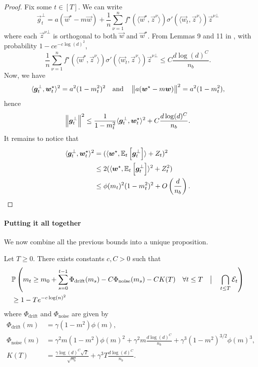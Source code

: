 \begin{proof}
    Fix some $t \in [T]$. We can write
    \[ \vec{g}_t^\bot = a(\vec{w}^\star - m\vec{w}) + \frac1n \sum_{\nu=1}^n f^\star(\langle \vec{w}^\star, \vec{z}^\nu \rangle) \sigma'(\langle \vec{w}_t, \vec{z}^\nu \rangle) \vec{z}^{\nu\bot}\]
    where each $\vec{z}^{\nu\bot}$ is orthogonal to both $\vec{w}$ and $\vec{w}^\star$. From Lemmas 9 and 11 in \cite{dandi2023how}, with probability $1 - ce^{-c\log(d)^2}$,
    \[ \frac1n \sum_{\nu=1}^n f^\star(\langle \vec{w}^\star, \vec{z}^\nu \rangle) \sigma'(\langle \vec{w}_t, \vec{z}^\nu \rangle) \vec{z}^{\nu\bot} \leq C \frac{d\log(d)^C}{n_b}. \]
    Now, we have
    \[ \langle {\boldsymbol{g}}_t^\bot, {\boldsymbol{w}}_t^\star \rangle^2 = a^2(1 - m_t^2)^2 \quad \text{and} \quad \left\lVert a({\boldsymbol{w}}^\star - m{\boldsymbol{w}})\right\rVert^2 = a^2 (1-m_t^2), \]
    hence
    \[ \left\lVert  {\boldsymbol{g}}_t^\bot\right\rVert^2 \leq \frac1{1 - m_t^2} \langle {\boldsymbol{g}}_t^\bot, {\boldsymbol{w}}_t^\star \rangle^2 + C \frac{d\log(d)^C}{n_b}.  \]
    It remains to notice that
    \begin{align*}
        \langle {\boldsymbol{g}}_t^\bot, {\boldsymbol{w}}_t^\star \rangle^2 &= (\langle {\boldsymbol{w}}^\star, \mathbb{E}_t\left[{\boldsymbol{g}}_t^\bot\right] \rangle + Z_t)^2 \\
        &\leq 2(\langle {\boldsymbol{w}}^\star, \mathbb{E}_t\left[{\boldsymbol{g}}_t^\bot\right] \rangle^2 + Z_t^2) \\
        &\leq \phi(m_t)^2(1 - m_t^2)^2 + O\left(\frac{d}{n_b}\right).
    \end{align*}
\end{proof}


\paragraph{Putting it all together} We now combine all the previous bounds into a unique proposition.
\begin{proposition}\label{2406:prop:app:diff_ineq_estimates}
    Let $T \geq 0$. There exists constants $c, C > 0$ such that
    \begin{equation}
        \begin{aligned}
            &\mathbb{P}\left(m_t \geq m_0 + \sum_{s=0}^{t-1} \Phi_{\mathrm{drift}}(m_s) - C\Phi_{\mathrm{noise}}(m_s) - C K(T) \quad \forall t \leq T \quad \big\vert\quad \bigcap_{t\leq T} \mathcal{E}_t \right) \\
            &\geq 1 - Te^{-c\log(n)^2}
        \end{aligned}
    \end{equation}
    where $\Phi_{\mathrm{drift}}$ and $\Phi_{\mathrm{noise}}$ are given by
    \begin{align}
        \Phi_{\mathrm{drift}}(m) &= \gamma (1-m^2) \phi(m), \\
        \Phi_{\mathrm{noise}}(m) &=  \gamma^2 m(1 - m^2)\phi(m)^2 + \gamma^2 m \frac{d \log(d)^C}{n_b} +  \gamma^3 (1 - m^2)^{3/2}\phi(m)^3,  \\
        K(T) &= \frac{ \gamma \log(d)^C \sqrt{T}}{\sqrt{n_b}} +  \gamma^3 T\frac{d \log(d)^C}{n_b}.
    \end{align}
\end{proposition}

